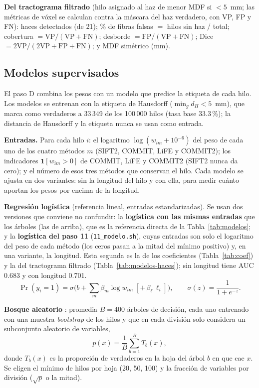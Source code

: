 \documentclass[11pt,a4paper]{article}
\newcommand{\code}[1]{\texttt{\small #1}}
\begin{document}
\textbf{Del tractograma filtrado} (hilo asignado al haz de menor MDF si $<5$~mm; las
m\'etricas de v\'oxel se calculan contra la m\'ascara del haz verdadero, con VP, FP y FN):
haces detectados (de 21); \% de fibras falsas $=$ hilos sin haz / total;
cobertura $=\mathrm{VP}/(\mathrm{VP}+\mathrm{FN})$; desborde $=\mathrm{FP}/(\mathrm{VP}+\mathrm{FN})$;
Dice $=2\mathrm{VP}/(2\mathrm{VP}+\mathrm{FP}+\mathrm{FN})$; y MDF sim\'etrico (mm).

\subsection{Modelos supervisados}
\label{sec:modelos-met}

El paso D combina los pesos con un modelo que predice la etiqueta de cada hilo. Los
modelos se entrenan con la etiqueta de Hausdorff ($\min_g d_H<5$~mm), que marca como
verdaderos a 33\,349 de los 100\,000 hilos (tasa base 33.3\,\%); la distancia de Hausdorff
y la etiqueta nunca se usan como entrada.

\textbf{Entradas.} Para cada hilo $i$: el logaritmo $\log(w_{im}+10^{-6})$ del peso de
cada uno de los cuatro m\'etodos $m$ (SIFT2, COMMIT, LiFE y COMMIT2); los indicadores
$\mathbf{1}[w_{im}>0]$ de COMMIT, LiFE y COMMIT2 (SIFT2 nunca da cero); y el n\'umero de esos
tres m\'etodos que conservan el hilo. Cada modelo se ajusta en dos variantes: sin la
longitud del hilo y con ella, para medir cu\'anto aportan los pesos por encima de la
longitud.

\textbf{Regresi\'on log\'istica} (referencia lineal, entradas estandarizadas). Se usan dos
versiones que conviene no confundir: la \textbf{log\'istica con las mismas entradas} que los
\'arboles (las de arriba), que es la referencia directa de la Tabla~\ref{tab:modelos}; y la
\textbf{log\'istica del paso 11} (\code{11\_modelo.sh}), cuyas entradas son solo el logaritmo
del peso de cada m\'etodo (los ceros pasan a la mitad del m\'inimo positivo) y, en una variante,
la longitud. Esta segunda es la de los coeficientes (Tabla~\ref{tab:coef}) y la del
tractograma filtrado (Tabla~\ref{tab:modelos-haces}); sin longitud tiene AUC 0.683 y con
longitud 0.701.
\begin{equation}
  \Pr(y_i=1)=\sigma\Big(b+\textstyle\sum_m \beta_m \log w_{im}\;[+\,\beta_\ell\,\ell_i]\Big),
  \qquad \sigma(z)=\frac{1}{1+e^{-z}} .
\end{equation}

\textbf{Bosque aleatorio} \cite{breiman2001}: promedia $B=400$ \'arboles de decisi\'on,
cada uno entrenado con una muestra \textit{bootstrap} de los hilos y que en cada divisi\'on
solo considera un subconjunto aleatorio de variables,
\begin{equation}
  p(x)=\frac1B\sum_{b=1}^{B}T_b(x),
\end{equation}
donde $T_b(x)$ es la proporci\'on de verdaderos en la hoja del \'arbol $b$ en que cae $x$.
Se eligen el m\'inimo de hilos por hoja (20, 50, 100) y la fracci\'on de variables por
divisi\'on ($\sqrt{p}$ o la mitad).
\end{document}
